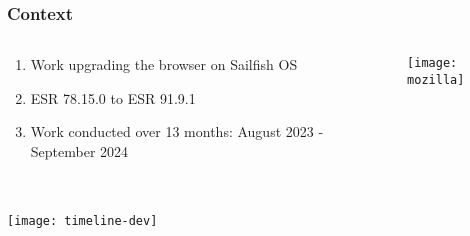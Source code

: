 \documentclass[
	notes=none,
	aspectratio=169
]{beamer}
\begin{document}

\begin{frame}
\frametitle{Context}

\begin{columns}[T]
\begin{column}[T]{0.5\textwidth}
\setlength{\parskip}{0.5em}

\vspace{1.5cm}
\begin{enumerate}
\setlength{\parskip}{0.5em}
\item Work upgrading the browser on Sailfish OS
\item ESR 78.15.0 to ESR 91.9.1
\item Work conducted over 13 months: August 2023 - September 2024
\end{enumerate}

\end{column}
\begin{column}[T]{0.5\textwidth}
\setlength{\parskip}{0.5em}

\vspace{0.5cm}
\texttt{[image: mozilla]}

\end{column}
\end{columns}

\end{frame}
\note{
\begin{enumerate}
\item -
\end{enumerate}
}


\begin{frame}
\frametitle{}

\begin{columns}[T]
\begin{column}[T]{1.13\textwidth}

\vspace{0.0cm}
\texttt{[image: timeline-dev]}

\end{column}
\end{columns}

\end{frame}
\end{document}

